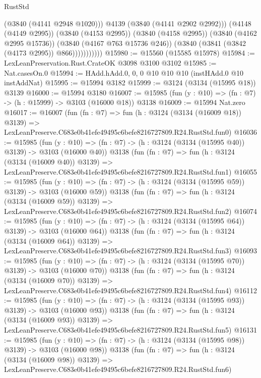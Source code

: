 \begin{lexlean}{RustStd}
\begin{coremodule}
                          (@3840 (@4141 @2948 @1020)))
                        @4139
                        (@3840 (@4141 @2902 @2992)))
                      (@4148 (@4149 @2995))
                      (@3840 (@4153 @2995))
                      (@3840 (@4158 @2995))
                      (@3840 (@4162 @2995 @15736))
                      (@3840 (@4167 @763 @15736 @246))
                      (@3840 (@3841 (@3842 (@4173 @2995)) @866)))))))))))
@15980 := @15560 (@15585 @15978)
@15984 := LexLeanPreservation.Rust.CrateOK @3098 @3100 @3102
@15985 := Nat.casesOn.{0}
@15994 := HAdd.hAdd.{0, 0, 0} @10 @10 @10 (instHAdd.{0} @10 instAddNat)
@15995 := @15994 @3182
@15999 := @3124 (@3134 (@15995 @18)) @3139
@16000 := @15994 @3180
@16007 := @15985 (fun (y : @10) => (fn : @7) -> (h : @15999) -> @3103 (@16000 @18)) @3138
@16009 := @15994 Nat.zero
@16017 := @16007
    (fun (fn : @7) =>
    fun (h : @3124 (@3134 (@16009 @18)) @3139) =>
    LexLeanPreserve.C683e0b41efe49495c6befe8216727809.R24.RustStd.fun0)
@16036 := @15985
    (fun (y : @10) => (fn : @7) -> (h : @3124 (@3134 (@15995 @40)) @3139) -> @3103 (@16000 @40))
    @3138
    (fun (fn : @7) =>
    fun (h : @3124 (@3134 (@16009 @40)) @3139) =>
    LexLeanPreserve.C683e0b41efe49495c6befe8216727809.R24.RustStd.fun1)
@16055 := @15985
    (fun (y : @10) => (fn : @7) -> (h : @3124 (@3134 (@15995 @59)) @3139) -> @3103 (@16000 @59))
    @3138
    (fun (fn : @7) =>
    fun (h : @3124 (@3134 (@16009 @59)) @3139) =>
    LexLeanPreserve.C683e0b41efe49495c6befe8216727809.R24.RustStd.fun2)
@16074 := @15985
    (fun (y : @10) => (fn : @7) -> (h : @3124 (@3134 (@15995 @64)) @3139) -> @3103 (@16000 @64))
    @3138
    (fun (fn : @7) =>
    fun (h : @3124 (@3134 (@16009 @64)) @3139) =>
    LexLeanPreserve.C683e0b41efe49495c6befe8216727809.R24.RustStd.fun3)
@16093 := @15985
    (fun (y : @10) => (fn : @7) -> (h : @3124 (@3134 (@15995 @70)) @3139) -> @3103 (@16000 @70))
    @3138
    (fun (fn : @7) =>
    fun (h : @3124 (@3134 (@16009 @70)) @3139) =>
    LexLeanPreserve.C683e0b41efe49495c6befe8216727809.R24.RustStd.fun4)
@16112 := @15985
    (fun (y : @10) => (fn : @7) -> (h : @3124 (@3134 (@15995 @93)) @3139) -> @3103 (@16000 @93))
    @3138
    (fun (fn : @7) =>
    fun (h : @3124 (@3134 (@16009 @93)) @3139) =>
    LexLeanPreserve.C683e0b41efe49495c6befe8216727809.R24.RustStd.fun5)
@16131 := @15985
    (fun (y : @10) => (fn : @7) -> (h : @3124 (@3134 (@15995 @98)) @3139) -> @3103 (@16000 @98))
    @3138
    (fun (fn : @7) =>
    fun (h : @3124 (@3134 (@16009 @98)) @3139) =>
    LexLeanPreserve.C683e0b41efe49495c6befe8216727809.R24.RustStd.fun6)

\end{coremodule}
\end{lexlean}
